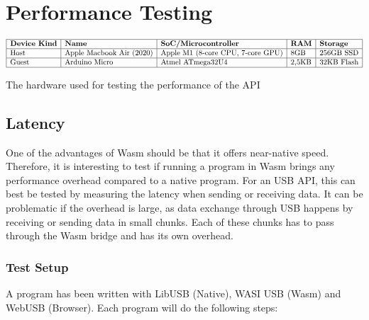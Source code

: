 \section{Performance Testing}

\begin{table}[H]
\[
\begin{array}{|l|l|l|l|l|l|}
\hline
\textbf{Device Kind} & \textbf{Name} & \textbf{SoC/Microcontroller} & \textbf{RAM} & \textbf{Storage} \\
\hline
\text{Host} & \text{Apple Macbook Air (2020)} & \text{Apple M1 (8-core CPU, 7-core GPU)} & \text{8GB} & \text{256GB SSD} \\

\hline
\text{Guest} & \text{Arduino Micro} & \text{Atmel ATmega32U4} & \text{2,5KB} & \text{32KB Flash} \\
\hline
\end{array}
\]
\caption{The hardware used for testing the performance of the API}
\end{table}


\subsection{Latency}

One of the advantages of \acrshort{Wasm} should be that it offers near-native speed. Therefore, it is interesting to test if running a program in Wasm brings any performance overhead compared to a native program. For an USB API, this can best be tested by measuring the latency when sending or receiving data. It can be problematic if the overhead is large, as data exchange through USB happens by receiving or sending data in small chunks. Each of these chunks has to pass through the Wasm bridge and has its own overhead.

\subsubsection{Test Setup}
A program has been written with LibUSB (Native), WASI USB (Wasm) and WebUSB (Browser). Each program will do the following steps:

